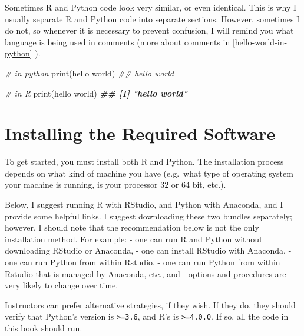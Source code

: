\documentclass[
  12pt,
]{krantz}
\makeatletter
\newenvironment{Shaded}{\begin{snugshade}}{\end{snugshade}}
\newcommand{\BuiltInTok}[1]{#1}
\newcommand{\CommentTok}[1]{\textcolor[rgb]{0.37,0.37,0.37}{\textit{#1}}}
\newcommand{\DocumentationTok}[1]{\textcolor[rgb]{0.37,0.37,0.37}{\textbf{\textit{#1}}}}
\newcommand{\FunctionTok}[1]{\textcolor[rgb]{0,0,0}{#1}}
\newcommand{\NormalTok}[1]{#1}
\newcommand{\StringTok}[1]{\textcolor[rgb]{0.5,0.5,0.5}{#1}}
\newenvironment{kframe}{%
\medskip{}
\setlength{\fboxsep}{.8em}
 \def\at@end@of@kframe{}%
 \ifinner\ifhmode%
  \def\at@end@of@kframe{\end{minipage}}%
  \begin{minipage}{\columnwidth}%
 \fi\fi%
 \def\FrameCommand##1{\hskip\@totalleftmargin \hskip-\fboxsep
 \colorbox{shadecolor}{##1}\hskip-\fboxsep
     \hskip-\linewidth \hskip-\@totalleftmargin \hskip\columnwidth}%
 \MakeFramed {\advance\hsize-\width
   \@totalleftmargin\z@ \linewidth\hsize
   \@setminipage}}%
 {\par\unskip\endMakeFramed%
 \at@end@of@kframe}
\renewenvironment{Shaded}{\begin{kframe}}{\end{kframe}}
\makeatother
\begin{document}
Sometimes R and Python code look very similar, or even identical. This is why I usually separate R and Python code into separate sections. However, sometimes I do not, so whenever it is necessary to prevent confusion, I will remind you what language is being used in comments (more about comments in \ref{hello-world-in-python} ).

\begin{Shaded}
\begin{Highlighting}[]
\CommentTok{\# in python}
\BuiltInTok{print}\NormalTok{(}\StringTok{\textquotesingle{}hello world\textquotesingle{}}\NormalTok{)}
\CommentTok{\#\# hello world}
\end{Highlighting}
\end{Shaded}

\begin{Shaded}
\begin{Highlighting}[]
\CommentTok{\# in R}
\FunctionTok{print}\NormalTok{(}\StringTok{\textquotesingle{}hello world\textquotesingle{}}\NormalTok{)}
\DocumentationTok{\#\# [1] "hello world"}
\end{Highlighting}
\end{Shaded}

\hypertarget{installing-the-required-software}{%
\section*{Installing the Required Software}\label{installing-the-required-software}}


To get started, you must install both R and Python. The installation process depends on what kind of machine you have (e.g.~what type of operating system your machine is running, is your processor \(32\) or \(64\) bit, etc.).

Below, I suggest running R with RStudio, and Python with Anaconda, and I provide some helpful links. I suggest downloading these two bundles separately; however, I should note that the recommendation below is not the only installation method. For example:
- one can run R and Python without downloading RStudio or Anaconda,
- one can install RStudio with Anaconda,
- one can run Python from within Rstudio,
- one can run Python from within Rstudio that is managed by Anaconda, etc., and
- options and procedures are very likely to change over time.

Instructors can prefer alternative strategies, if they wish. If they do, they should verify that Python's version is \texttt{\textgreater{}=3.6}, and R's is \texttt{\textgreater{}=4.0.0}. If so, all the code in this book should run.
\end{document}
